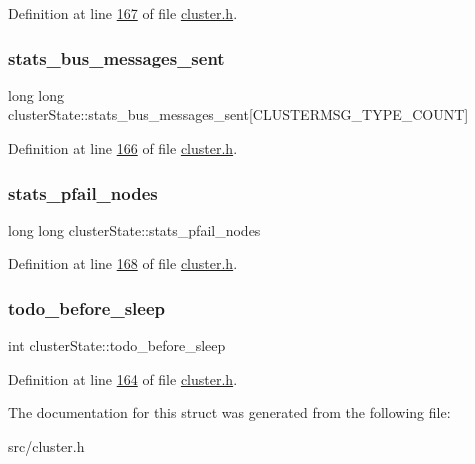 Definition at line \hyperlink{cluster_8h_source_l00167}{167} of file \hyperlink{cluster_8h_source}{cluster.\+h}.

\mbox{\label{structclusterState_a2e05a3efe6eef76b7db90b03f8a71a50}} 
\subsubsection{\texorpdfstring{stats\+\_\+bus\+\_\+messages\+\_\+sent}{stats\_bus\_messages\_sent}}
{\footnotesize\ttfamily long long cluster\+State\+::stats\+\_\+bus\+\_\+messages\+\_\+sent\mbox{[}C\+L\+U\+S\+T\+E\+R\+M\+S\+G\+\_\+\+T\+Y\+P\+E\+\_\+\+C\+O\+U\+NT\mbox{]}}



Definition at line \hyperlink{cluster_8h_source_l00166}{166} of file \hyperlink{cluster_8h_source}{cluster.\+h}.

\mbox{\label{structclusterState_ab6b2341a5c8bb775387a45c350c4a335}} 
\subsubsection{\texorpdfstring{stats\+\_\+pfail\+\_\+nodes}{stats\_pfail\_nodes}}
{\footnotesize\ttfamily long long cluster\+State\+::stats\+\_\+pfail\+\_\+nodes}



Definition at line \hyperlink{cluster_8h_source_l00168}{168} of file \hyperlink{cluster_8h_source}{cluster.\+h}.

\mbox{\label{structclusterState_ac9c16c374097b11583e5660659e2bc7a}} 
\subsubsection{\texorpdfstring{todo\+\_\+before\+\_\+sleep}{todo\_before\_sleep}}
{\footnotesize\ttfamily int cluster\+State\+::todo\+\_\+before\+\_\+sleep}



Definition at line \hyperlink{cluster_8h_source_l00164}{164} of file \hyperlink{cluster_8h_source}{cluster.\+h}.



The documentation for this struct was generated from the following file\+:\begin{DoxyCompactItemize}
\item 
src/cluster.\+h\end{DoxyCompactItemize}
